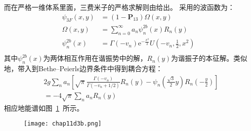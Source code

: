 而在严格一维体系里面，三费米子的严格求解则由\cite{Rittenhouse2010green,d2014three,loft2015variational,andersen2016interpolatory,bellotti2017comparing}给出。
采用的波函数为：
\begin{equation}
\begin{split}
\psi_{3 F}(x, y)&=\left(1-\boldsymbol{P}_{13}\right) \Omega(x, y)\\
\Omega(x, y)&=\sum_{n=0}^{\infty} a_{n} \psi_{n}^{2b}(x) R_{n}(y)\\
\psi_{n}^{2b}(x)&=\Gamma\left(-v_{n}\right) \mathrm{e}^{-\frac{x^{2}}{2}} U\left(-v_{n}, \frac{1}{2}, x^{2}\right)\\
\end{split}
\end{equation}
其中$\psi_{n}^{2b}(x)$为两体相互作用在谐振势中的解，$R_{n}(y)$为谐振子的本征解。类似地，带入到Bethe–Peierls边界条件中得到耦合方程：
\begin{equation}
\begin{aligned}
&2 g \sum_{n} a_{n}\left[\sqrt{\pi} \frac{\Gamma\left(-v_{n}\right)}{\Gamma\left(-v_{n}+1 / 2\right)} R_{n}(y)-\psi_{n}\left(\frac{\sqrt{3}}{2} y\right) R_{n}\left(-\frac{y}{2}\right)\right] \\
&=-4 \sqrt{\pi} \sum_{n} a_{n} R_{n}(y)
\end{aligned}
\end{equation}
相应地能谱如图~\ref{1d3b}~所示。
\begin{figure}[!htbp]
    \centering
    \texttt{[image: chap11d3b.png]}
    \label{1d3b}
\end{figure}

